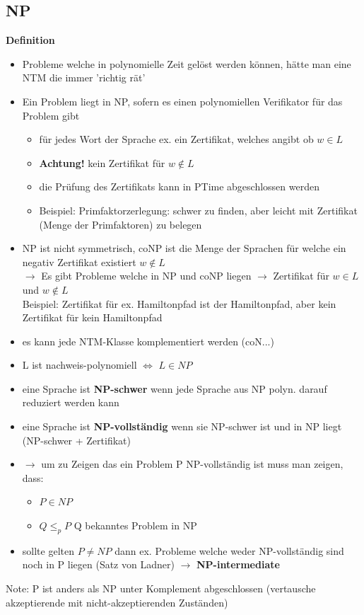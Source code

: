 \documentclass[12pt,a4paper]{article}
\begin{document}
\subsection{NP}
\textbf{Definition}
\begin{itemize}
\item Probleme welche in polynomielle Zeit gelöst werden können, hätte man eine NTM die immer 'richtig rät'
\item Ein Problem liegt in NP, sofern es einen polynomiellen Verifikator für das Problem gibt
\begin{itemize}
\item für jedes Wort der Sprache ex. ein Zertifikat, welches angibt ob $w \in L$
\item \textbf{Achtung!} kein Zertifikat für $w \not\in L$
\item die Prüfung des Zertifikats kann in PTime abgeschlossen werden
\item Beispiel: Primfaktorzerlegung: schwer zu finden, aber leicht mit Zertifikat (Menge der Primfaktoren) zu belegen
\end{itemize}
\item NP ist nicht symmetrisch, coNP ist die Menge der Sprachen für welche ein negativ Zertifikat existiert $w \not\in L$\\
$\rightarrow$ Es gibt Probleme welche in NP und coNP liegen $\rightarrow$ Zertifikat für $w\in L$ und $w \not\in L$\\
Beispiel: Zertifikat für ex. Hamiltonpfad ist der Hamiltonpfad, aber kein Zertifikat für kein Hamiltonpfad
\item es kann jede NTM-Klasse komplementiert werden (coN...)
\item L ist nachweis-polynomiell $\Leftrightarrow$ $L \in NP$
\item eine Sprache ist \textbf{NP-schwer} wenn jede Sprache aus NP polyn. darauf reduziert werden kann
\item eine Sprache ist \textbf{NP-vollständig} wenn sie NP-schwer ist und in NP liegt\\ (NP-schwer + Zertifikat)
\item $\rightarrow$ um zu Zeigen das ein Problem P NP-vollständig ist muss man zeigen, dass: 
\begin{itemize}
\item $P \in NP$
\item $Q \leq_p P$ Q bekanntes Problem in NP
\end{itemize}
\item sollte gelten $P \neq NP$ dann ex. Probleme welche weder NP-vollständig sind noch in P liegen (Satz von Ladner) $\rightarrow$ \textbf{NP-intermediate}
\end{itemize}
Note: P ist anders als NP unter Komplement abgeschlossen (vertausche akzeptierende mit nicht-akzeptierenden Zuständen)
\end{document}
